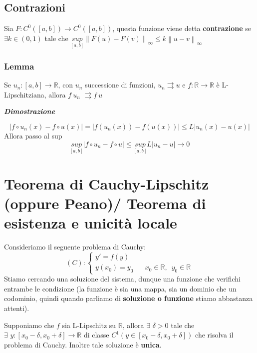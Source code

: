\documentclass{article}
\theoremstyle{definition}
\newcommand{\R}{\mathbb{R}}
\begin{document}
\subsection{Contrazioni}
Sia $F: C^0([a,b]) \to C^0([a,b])$, questa funzione viene detta \textbf{contrazione} se $\exists k \in (0,1)$ tale che $\underset{[a,b]}{sup}\left\|F(u)-F(v)\right\| _\infty\leqslant k\left\|u-v\right\|_\infty$

\subsubsection{Lemma}
Se $u_n: [a,b] \to \R$, con $u_n$ successione di funzioni, $u_n \rightrightarrows u$ e $f: \R \to \R$ è L-Lipschitziana, allora $f \ u_n \,\, \rightrightarrows f \ u$

\begin{center}
    \textbf{\textit{Dimostrazione}}
\end{center}
\begin{equation}
    |f \circ u_n(x)-f \circ u(x)|=|f(u_n(x))-f(u(x))| \leqslant L|u_n(x)-u(x)|
\end{equation}
Allora passo al sup
\begin{equation}
    \underset{[a,b]}{sup}|f \circ u_n - f \circ u| \leqslant \underset{[a,b]}{sup}L|u_n-u| \to 0
\end{equation}

\section{Teorema di Cauchy-Lipschitz (oppure Peano)/ Teorema di esistenza e unicità locale}
Consideriamo il seguente problema di Cauchy:
\begin{equation}
    (C): \begin{cases}
        y'=f(y) \\
        y(x_0)=y_0 \,\,\,\,\,\,\,\,\,\, x_0 \in \R , \,\,\, y_0 \in \R
    \end{cases}
\end{equation}
Stiamo cercando una soluzione del sistema, dunque una funzione che verifichi entrambe le condizione (la funzione è sia una mappa, sia un dominio che un codominio, quindi quando parliamo di \textbf{soluzione o funzione} stiamo abbastanza attenti).
\\
\begin{center}
Supponiamo che $f$ sia L-Lipschitz su $\R$, allora $\exists \,\, \delta > 0$ tale che $\exists \,\, y:[x_0-\delta, x_0+\delta] \to \R$ di classe $C^1(y \in [x_0 - \delta, x_0 + \delta])$ che risolva il problema di Cauchy. Inoltre tale soluzione è \textbf{unica}.
\end{center}
\end{document}

